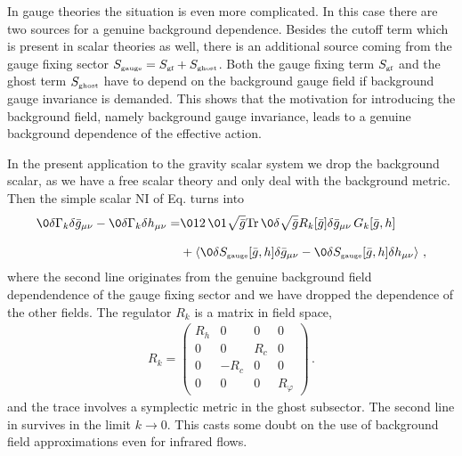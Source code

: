 \documentclass[11pt]{book} %
\newcommand{\Tr}{\mathrm{Tr}}
\begin{document}
{In gauge theories the situation is even more complicated.
In this case
there are two sources for a genuine background dependence.
Besides the cutoff term which is present in scalar theories as well,
there is an additional source coming from the gauge fixing sector
$S_{\text{\tiny gauge}}=S_{\text{\tiny gf}}+S_{\text{\tiny ghost}}$.
Both the gauge fixing term $S_{\text{\tiny gf}}$ and the
ghost term $S_{\text{\tiny ghost}}$ have to depend on the background
gauge field if background gauge invariance is demanded.
This shows that the motivation for introducing the background field, namely
background gauge invariance, leads to a genuine background
dependence of the effective action.

In the present application to the gravity scalar system we
drop the background scalar, as we have a free scalar theory and only
deal with the background metric. Then the simple scalar NI of Eq.
 turns into
\begin{align}\nonumber
	\0{\delta \Gamma_k}{\delta\bar g_{\mu\nu}}-\0{\delta
	\Gamma_k}{\delta h_{\mu\nu}} =& \012 \,\01{\sqrt{\bar g}} \Tr\, \0{\delta \sqrt{\bar g}
	R_k[\bar g]}{\delta \bar g_{\mu\nu}}\, G_k[\bar g, h]\\[2ex]
	&+\left\langle \0{\delta S_{\text{\tiny
	gauge}}[\bar g,h]}{\delta \bar g_{\mu\nu}}
	-\0{\delta S_{\text{\tiny gauge}}[\bar g,h]
}{\delta h_{\mu\nu}}\right\rangle \,,
\label{eq:gaugeNIk}\end{align}
where the second line originates from the genuine background field
dependendence of the gauge fixing sector and we have dropped the
dependence of the other fields. The regulator $R_k$ is a matrix in field
space,
\begin{align}
	R_k= \left( \begin{array}{cccc} R_h & 0 & 0 & 0\\
	0 &0& R_c&  0 \\
	0 &-R_c &0 &0 \\
0 & 0& 0& R_\varphi\end{array}\right)\,.
\end{align}
and the trace involves a symplectic metric in the ghost subsector. The
second line in  survives in the limit $k\to 0$. This
casts some doubt on the use of background field approximations even
for infrared flows.

}
\end{document}
